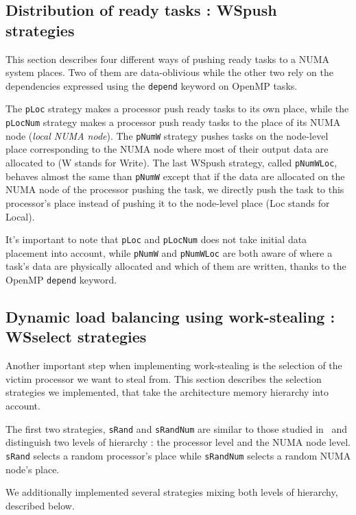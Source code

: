 \documentclass{Styles/llncs}
\begin{document}
\subsection{Distribution of ready tasks : WSpush strategies}

This section describes four different ways of pushing ready tasks to a NUMA system places.
Two of them are data-oblivious while the other two rely on the dependencies expressed using the \verb!depend! keyword on OpenMP tasks.

The \verb/pLoc/ strategy makes a processor push ready tasks to
    its own place, while the \verb/pLocNum/ strategy makes a processor push ready tasks to the place of its NUMA node (\emph{local NUMA node}).
The \verb/pNumW/ strategy pushes tasks on the node-level place corresponding to the NUMA node where most of their output data are allocated to (W stands for Write).
The last WSpush strategy, called \verb/pNumWLoc/, behaves almost the same than \verb!pNumW! except that if
    the data are allocated on the NUMA node of the processor pushing the task, we directly push the task to this processor's place instead of pushing it to the node-level place (Loc stands for Local).
    
    It's important to note that \verb!pLoc! and \verb!pLocNum! does not take initial data placement into account, while \verb!pNumW! and \verb!pNumWLoc! are both aware of where a task's data are physically allocated and which of them are written, thanks to the OpenMP \verb!depend! keyword.

\subsection{Dynamic load balancing using work-stealing : WSselect strategies}

Another important step when implementing work-stealing is the selection of the victim processor we want to steal from.
This section describes the selection strategies we implemented, that take the architecture memory hierarchy into account.

The first two strategies, \verb!sRand! and \verb!sRandNum! are similar to those studied in~\cite{DBLP:journals/ijhpca/OlivierPWSP12}
and distinguish two levels of hierarchy : the processor level and the NUMA node level.
\verb/sRand/ selects a random processor's place while \verb/sRandNum/ selects a random NUMA node's place.

We additionally implemented several strategies mixing both levels of hierarchy,
described below.
\end{document}
